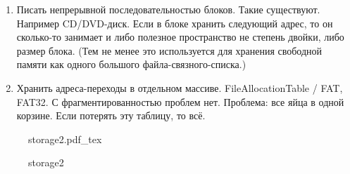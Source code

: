 \documentclass{book}
\theoremstyle{definition}
\newcommand{\incfig}[1]{%
    \def\svgwidth{\columnwidth}
    {#1.pdf_tex}
}
\begin{document}
\begin{enumerate}
    \item Писать непрерывной последовательностью блоков. Такие существуют. Например CD/DVD-диск. Если в блоке хранить следующий адрес, то он сколько-то занимает и либо полезное пространство не степень двойки, либо размер блока. (Тем не менее это используется для хранения свободной памяти как одного большого файла-связного-списка.)
    \item Хранить адреса-переходы в отдельном массиве. FileAllocationTable / FAT, FAT32. С фрагментированностью проблем нет. Проблема: все яйца в одной корзине. Если потерять эту таблицу, то всё.
\end{enumerate}


\begin{figure}[!ht]
    \centering
    \incfig{storage2}
    \caption{storage2}
    \label{fig:storage2}
\end{figure}
\end{document}
